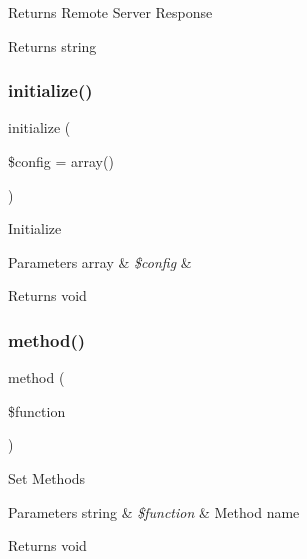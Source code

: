 Returns Remote Server Response

\begin{DoxyReturn}{Returns}
string 
\end{DoxyReturn}
\mbox{\label{class_c_i___xmlrpc_a481385e36d920f5a5005ace05c6cd016}} 
\subsubsection{\texorpdfstring{initialize()}{initialize()}}
{\footnotesize\ttfamily initialize (\begin{DoxyParamCaption}\item[{}]{\$config = {\ttfamily array()} }\end{DoxyParamCaption})}

Initialize


\begin{DoxyParams}[1]{Parameters}
array & {\em \$config} & \\
\hline
\end{DoxyParams}
\begin{DoxyReturn}{Returns}
void 
\end{DoxyReturn}
\mbox{\label{class_c_i___xmlrpc_a3d7e090549ec52eba8cf65598eefa72c}} 
\subsubsection{\texorpdfstring{method()}{method()}}
{\footnotesize\ttfamily method (\begin{DoxyParamCaption}\item[{}]{\$function }\end{DoxyParamCaption})}

Set Methods


\begin{DoxyParams}[1]{Parameters}
string & {\em \$function} & Method name \\
\hline
\end{DoxyParams}
\begin{DoxyReturn}{Returns}
void 
\end{DoxyReturn}
\mbox{\label{class_c_i___xmlrpc_a10d4ec842c61f2301ecccc900500e4c8}} 
